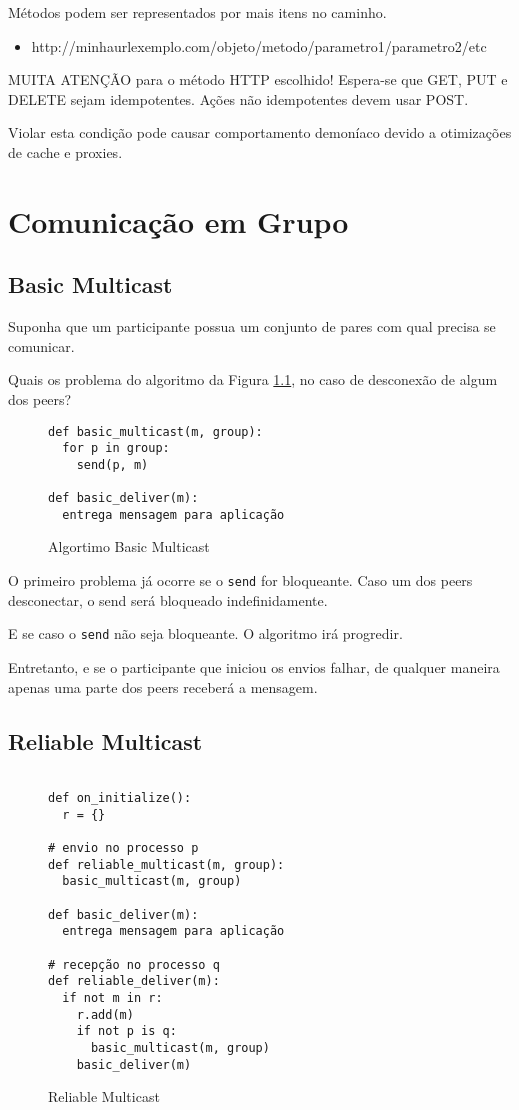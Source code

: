 \documentclass{book}
\begin{document}
Métodos podem ser representados por mais itens no caminho.

\begin{itemize}
\item http://minhaurlexemplo.com/objeto/metodo/parametro1/parametro2/etc
\end{itemize}

MUITA ATENÇÃO para o método HTTP escolhido!
Espera-se que GET, PUT e DELETE sejam idempotentes. Ações não idempotentes devem usar POST.

Violar esta condição pode causar comportamento demoníaco devido a otimizações de cache e proxies.

\chapter{Comunicação em Grupo}

\section{Basic Multicast}
Suponha que um participante possua um conjunto de pares com qual precisa se comunicar.

Quais os problema do algoritmo da Figura \ref{alg:basic}, no caso de desconexão de algum dos peers?

\begin{figure}
\begin{verbatim}
def basic_multicast(m, group):
  for p in group:
    send(p, m)

def basic_deliver(m):
  entrega mensagem para aplicação
\end{verbatim}
  \caption{Algortimo Basic Multicast}
  \label{alg:basic}
\end{figure}

O primeiro problema já ocorre se o \texttt{send} for bloqueante.
Caso um dos peers desconectar, o send será bloqueado indefinidamente.

E se caso o \texttt{send} não seja bloqueante. O algoritmo irá progredir.

Entretanto, e se o participante que iniciou os envios falhar, de qualquer maneira
apenas uma parte dos peers receberá a mensagem.

\section{Reliable Multicast}

\begin{figure}
\begin{verbatim}

def on_initialize():
  r = {}

# envio no processo p
def reliable_multicast(m, group):
  basic_multicast(m, group)
  
def basic_deliver(m):
  entrega mensagem para aplicação

# recepção no processo q
def reliable_deliver(m):
  if not m in r:
    r.add(m)
    if not p is q:
      basic_multicast(m, group)
    basic_deliver(m)

\end{verbatim}
  \caption{Reliable Multicast}
  \label{alg:reliable}
\end{figure}
\end{document}
